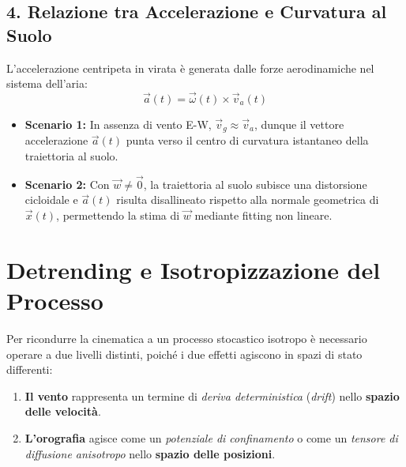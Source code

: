\documentclass[11pt,a4paper]{article}
\begin{document}
\subsection{4. Relazione tra Accelerazione e Curvatura al Suolo}
L'accelerazione centripeta in virata \`e generata dalle forze aerodinamiche nel sistema dell'aria:
\begin{equation}
    \vec{a}(t) = \vec{\omega}(t) \times \vec{v}_a(t)
\end{equation}
\begin{itemize}
    \item \textbf{Scenario 1:} In assenza di vento E-W, $\vec{v}_g \approx \vec{v}_a$, dunque il vettore accelerazione $\vec{a}(t)$ punta verso il centro di curvatura istantaneo della traiettoria al suolo.
    \item \textbf{Scenario 2:} Con $\vec{w} \neq \vec{0}$, la traiettoria al suolo subisce una distorsione cicloidale e $\vec{a}(t)$ risulta disallineato rispetto alla normale geometrica di $\vec{x}(t)$, permettendo la stima di $\vec{w}$ mediante fitting non lineare.
\end{itemize}

\section{Detrending e Isotropizzazione del Processo}

Per ricondurre la cinematica a un processo stocastico isotropo \`e necessario operare a due livelli distinti, poich\'e i due effetti agiscono in spazi di stato differenti:
\begin{enumerate}
    \item \textbf{Il vento} rappresenta un termine di \textit{deriva deterministica} (\textit{drift}) nello \textbf{spazio delle velocit\`a}.
    \item \textbf{L'orografia} agisce come un \textit{potenziale di confinamento} o come un \textit{tensore di diffusione anisotropo} nello \textbf{spazio delle posizioni}.
\end{enumerate}
\end{document}
